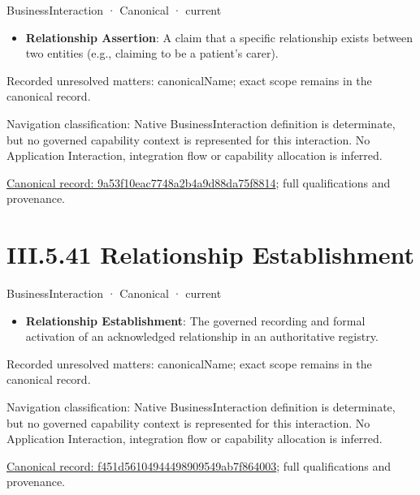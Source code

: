 \label{element:9a53f10eac7748a2b4a9d88da75f8814}
{\small BusinessInteraction · Canonical · current}\par

\begin{itemize}


\item \textbf{Relationship Assertion}: A claim that a specific relationship exists between two entities (e.g., claiming to be a patient's carer).

\end{itemize}

{\small Recorded unresolved matters: canonicalName; exact scope remains in the canonical record.}\par
{\small Navigation classification: Native BusinessInteraction definition is determinate, but no governed capability context is represented for this interaction. No Application Interaction, integration flow or capability allocation is inferred.}\par
{\footnotesize \href{../../../../../../../../continuum/business/business-interaction/9a53f10eac7748a2b4a9d88da75f8814.md}{Canonical record: 9a53f10eac7748a2b4a9d88da75f8814}; full qualifications and provenance.}\par
\section*{III.5.41 Relationship Establishment}
\label{navigation:III.5.41}

\label{element:f451d56104944498909549ab7f864003}
{\small BusinessInteraction · Canonical · current}\par

\begin{itemize}


\item \textbf{Relationship Establishment}: The governed recording and formal activation of an acknowledged relationship in an authoritative registry.

\end{itemize}

{\small Recorded unresolved matters: canonicalName; exact scope remains in the canonical record.}\par
{\small Navigation classification: Native BusinessInteraction definition is determinate, but no governed capability context is represented for this interaction. No Application Interaction, integration flow or capability allocation is inferred.}\par
{\footnotesize \href{../../../../../../../../continuum/business/business-interaction/f451d56104944498909549ab7f864003.md}{Canonical record: f451d56104944498909549ab7f864003}; full qualifications and provenance.}\par

